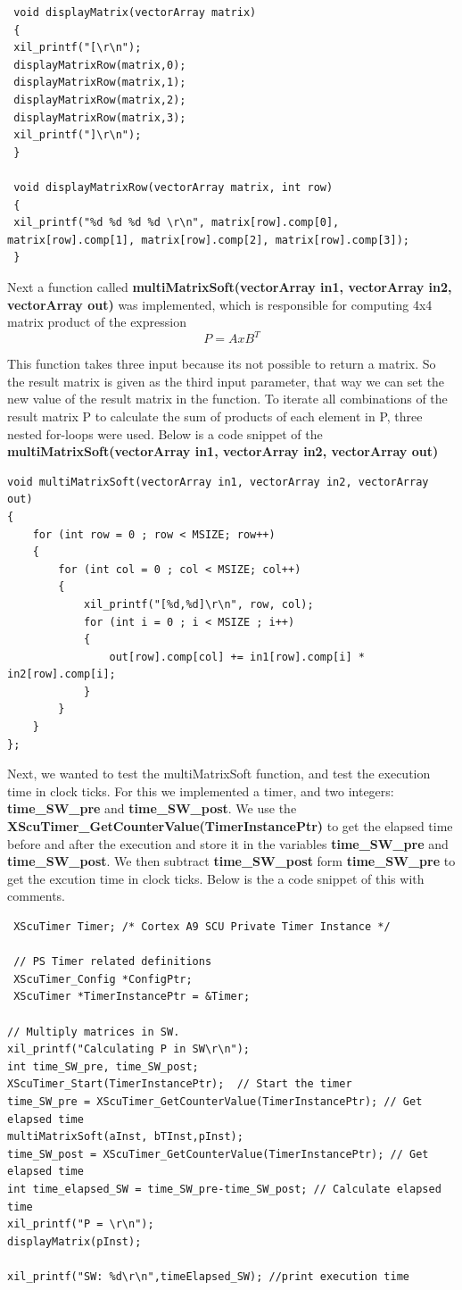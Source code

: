  \begin{lstlisting}
 void displayMatrix(vectorArray matrix)
 {
 xil_printf("[\r\n");
 displayMatrixRow(matrix,0);
 displayMatrixRow(matrix,1);
 displayMatrixRow(matrix,2);
 displayMatrixRow(matrix,3);
 xil_printf("]\r\n");
 }
 
 void displayMatrixRow(vectorArray matrix, int row)
 {
 xil_printf("%d %d %d %d \r\n", matrix[row].comp[0], matrix[row].comp[1], matrix[row].comp[2], matrix[row].comp[3]);
 }
 \end{lstlisting}
 
 Next a function called \textbf{multiMatrixSoft(vectorArray in1, vectorArray in2, vectorArray out)} was implemented, which is responsible for computing 4x4 matrix product of the expression \[ P = A x B^T \]
 
This function takes three input because its not possible to return a matrix. So the result matrix is given as the third input parameter, that way we can set the new value of the result matrix in the function. To iterate all combinations of the result matrix P to calculate the sum of products of each element in P, three nested for-loops were used. 
Below is a code snippet of the \textbf{multiMatrixSoft(vectorArray in1, vectorArray in2, vectorArray out)}

 \begin{lstlisting}
void multiMatrixSoft(vectorArray in1, vectorArray in2, vectorArray out)
{
	for (int row = 0 ; row < MSIZE; row++)
	{
		for (int col = 0 ; col < MSIZE; col++)
		{
			xil_printf("[%d,%d]\r\n", row, col);
			for (int i = 0 ; i < MSIZE ; i++)
			{
				out[row].comp[col] += in1[row].comp[i] * in2[row].comp[i];
			}
		}
	}
};
\end{lstlisting}

Next, we wanted to test the multiMatrixSoft function, and test the execution time in clock ticks. For this we implemented a timer, and two integers: \textbf{time\_SW\_pre} and \textbf{time\_SW\_post}. We use the \textbf{XScuTimer\_GetCounterValue(TimerInstancePtr)} to get the elapsed time before and after the execution and store it in the variables \textbf{time\_SW\_pre} and \textbf{time\_SW\_post}. We then subtract \textbf{time\_SW\_post} form \textbf{time\_SW\_pre} to get the excution time in clock ticks. Below is the a code snippet of this with comments. 


 \begin{lstlisting}
 XScuTimer Timer; /* Cortex A9 SCU Private Timer Instance */
 
 // PS Timer related definitions
 XScuTimer_Config *ConfigPtr;
 XScuTimer *TimerInstancePtr = &Timer;
 
// Multiply matrices in SW.
xil_printf("Calculating P in SW\r\n");
int time_SW_pre, time_SW_post;
XScuTimer_Start(TimerInstancePtr); 	// Start the timer
time_SW_pre = XScuTimer_GetCounterValue(TimerInstancePtr); // Get elapsed time
multiMatrixSoft(aInst, bTInst,pInst);
time_SW_post = XScuTimer_GetCounterValue(TimerInstancePtr); // Get elapsed time
int time_elapsed_SW = time_SW_pre-time_SW_post; // Calculate elapsed time
xil_printf("P = \r\n");
displayMatrix(pInst);

xil_printf("SW: %d\r\n",timeElapsed_SW); //print execution time
\end{lstlisting}

